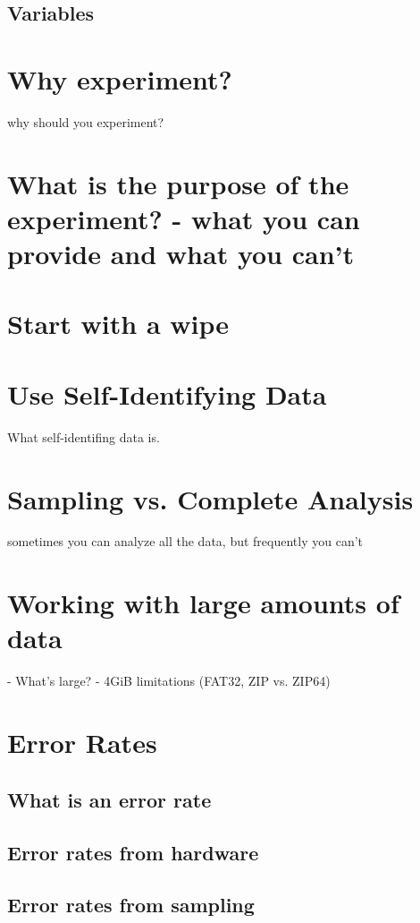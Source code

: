\subsection{Variables}

\section{Why experiment?}

why should you experiment?

\section{What is the purpose of the experiment? - what you can provide and what you can't}
\section{Start with a wipe}
\section{Use Self-Identifying Data}

What self-identifing data is.



\section{Sampling vs. Complete Analysis}

sometimes you can analyze all the data, but frequently you can't

\section{Working with large amounts of data}
 - What's large?
 - 4GiB limitations (FAT32, ZIP vs. ZIP64)
\section{Error Rates}
\subsection{What is an error rate}
\subsection{Error rates from hardware}
\subsection{Error rates from sampling}

